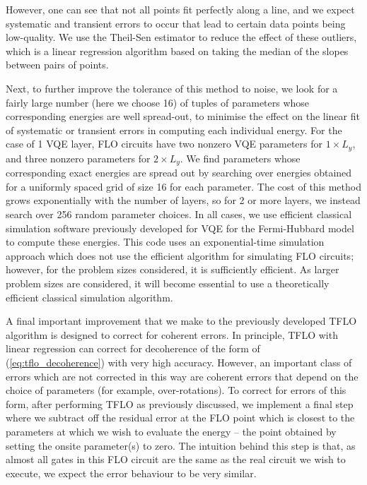 \documentclass[aps,prb,twoside,superscriptaddress,longbibliography,nofootinbib,floatfix, notitlepage,twocolumn]{revtex4-1}
\begin{document}
{However, one can see that not all points fit perfectly along a line, and we expect systematic and transient errors to occur that lead to certain data points being low-quality. We use the Theil-Sen estimator\cite{theil50,sen68} to reduce the effect of these outliers, which is a linear regression algorithm based on taking the median of the slopes between pairs of points.

Next, to further improve the tolerance of this method to noise, we look for a fairly large number (here we choose 16) of tuples of parameters whose corresponding energies are well spread-out, to minimise the effect on the linear fit of systematic or transient errors in computing each individual energy. For the case of 1 VQE layer, FLO circuits have two nonzero VQE parameters for $1 \times L_y$, and three nonzero parameters for $2 \times L_y$. We find parameters whose corresponding exact energies are spread out by searching over energies obtained for a uniformly spaced grid of size 16 for each parameter. The cost of this method grows exponentially with the number of layers, so for 2 or more layers, we instead search over 256 random parameter choices. In all cases, we use efficient classical simulation software previously developed for VQE for the Fermi-Hubbard model\cite{cade20} to compute these energies. This code uses an exponential-time simulation approach which does not use the efficient algorithm for simulating FLO circuits\cite{terhal02}; however, for the problem sizes considered, it is sufficiently efficient. As larger problem sizes are considered, it will become essential to use a theoretically efficient classical simulation algorithm.

A final important improvement that we make to the previously developed TFLO algorithm is designed to correct for coherent errors. In principle, TFLO with linear regression can correct for decoherence of the form of (\ref{eq:tflo_decoherence}) with very high accuracy. However, an important class of errors which are not corrected in this way are coherent errors that depend on the choice of parameters (for example, over-rotations). To correct for errors of this form, after performing TFLO as previously discussed, we implement a final step where we subtract off the residual error at the FLO point which is closest to the parameters at which we wish to evaluate the energy -- the point obtained by setting the onsite parameter(s) to zero. The intuition behind this step is that, as almost all gates in this FLO circuit are the same as the real circuit we wish to execute, we expect the error behaviour to be very similar.

}
\end{document}
